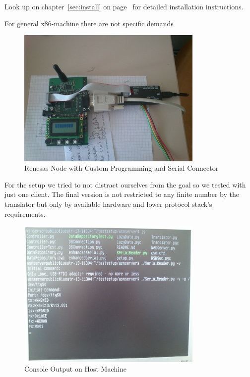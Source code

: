 Look up on chapter~\ref{sec:install} on page~\pageref{sec:install} for detailed installation instructions.

For general x86-machine there are not specific demands 

\begin{figure}[H]
   \centering
   \includegraphics[width=0.8\textwidth]{pic/controller.jpg}%
   \caption{Renesas Node with Custom Programming and Serial Connector}
   \label{fig:nodepic}%
\end{figure}

For the setup we tried to not distract ourselves from the goal so we tested with just one client. The final version is not restricted
to any finite number by the translator but only by available hardware and lower protocol stack's requirements.

\begin{figure}[H]
   \centering
   \includegraphics[width=0.8\textwidth]{pic/host_machine.jpg}%
   \caption{Console Output on Host Machine}
   \label{fig:hostpic}%
\end{figure}

